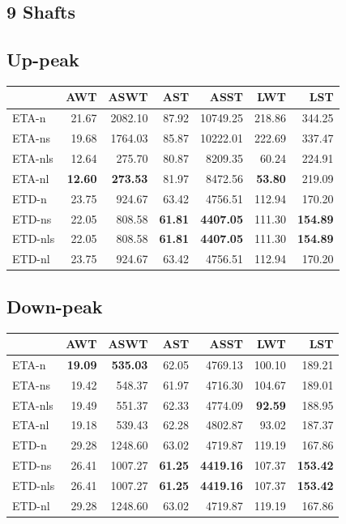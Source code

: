 \documentclass{UoYCSproject}
\begin{document}
\begin{appendices}
\section{9 Shafts}

\subsection{Up-peak}
\begin{tabular}{l | r r r r r r}
	& AWT & ASWT & AST & ASST & LWT & LST \\
	\hline
    ETA-n & 21.67 & 2082.10 & 87.92 & 10749.25 & 218.86 & 344.25 \\
    ETA-ns & 19.68 & 1764.03 & 85.87 & 10222.01 & 222.69 & 337.47 \\
    ETA-nls & 12.64 & 275.70 & 80.87 & 8209.35 & 60.24 & 224.91 \\
    ETA-nl & \textbf{12.60} & \textbf{273.53} & 81.97 & 8472.56 & \textbf{53.80} & 219.09 \\
    ETD-n & 23.75 & 924.67 & 63.42 & 4756.51 & 112.94 & 170.20 \\
    ETD-ns & 22.05 & 808.58 & \textbf{61.81} & \textbf{4407.05} & 111.30 & \textbf{154.89} \\
    ETD-nls & 22.05 & 808.58 & \textbf{61.81} & \textbf{4407.05} & 111.30 & \textbf{154.89} \\
    ETD-nl & 23.75 & 924.67 & 63.42 & 4756.51 & 112.94 & 170.20
\end{tabular}

\subsection{Down-peak}
\begin{tabular}{l | r r r r r r}
	& AWT & ASWT & AST & ASST & LWT & LST \\
	\hline
    ETA-n & \textbf{19.09} & \textbf{535.03} & 62.05 & 4769.13 & 100.10 & 189.21 \\
    ETA-ns & 19.42 & 548.37 & 61.97 & 4716.30 & 104.67 & 189.01 \\
    ETA-nls & 19.49 & 551.37 & 62.33 & 4774.09 & \textbf{92.59} & 188.95 \\
    ETA-nl & 19.18 & 539.43 & 62.28 & 4802.87 & 93.02 & 187.37 \\
    ETD-n & 29.28 & 1248.60 & 63.02 & 4719.87 & 119.19 & 167.86 \\
    ETD-ns & 26.41 & 1007.27 & \textbf{61.25} & \textbf{4419.16} & 107.37 & \textbf{153.42} \\
    ETD-nls & 26.41 & 1007.27 & \textbf{61.25} & \textbf{4419.16} & 107.37 & \textbf{153.42} \\
    ETD-nl & 29.28 & 1248.60 & 63.02 & 4719.87 & 119.19 & 167.86
\end{tabular}


\end{appendices}
\end{document}

